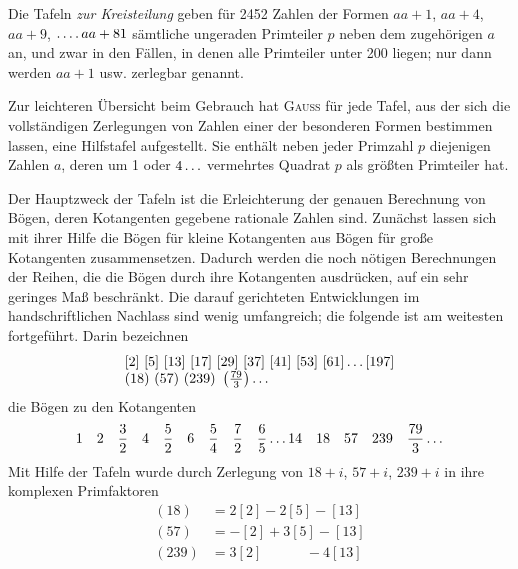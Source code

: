 \par Die Tafeln \textit{zur Kreisteilung} geben für 2452 Zahlen der Formen $aa+1$, $aa+4$, $aa+9$, $\mathinner{.\,.\,.\,.} aa+81$ sämtliche ungeraden Primteiler $p$ neben dem zugehörigen $a$ an, und zwar in den Fällen, in denen alle Primteiler unter 200 liegen; nur dann werden $aa+1$ usw. zerlegbar genannt.
\par Zur leichteren Übersicht beim Gebrauch hat \textsc{Gauss} für jede Tafel, aus der sich die vollständigen Zerlegungen von Zahlen einer der besonderen Formen bestimmen lassen, eine Hilfstafel aufgestellt. Sie enthält neben jeder Primzahl $p$ diejenigen Zahlen $a$, deren um 1 oder $4\mathinner{.\,.\,.}$ vermehrtes Quadrat $p$ als größten Primteiler hat.
\par Der Hauptzweck der Tafeln ist die Erleichterung der genauen Berechnung von Bögen, deren Kotangenten gegebene rationale Zahlen sind. Zunächst lassen sich mit ihrer Hilfe die Bögen für kleine Kotangenten aus Bögen für große Kotangenten zusammensetzen. Dadurch werden die noch nötigen Berechnungen der Reihen, die die Bögen durch ihre Kotangenten ausdrücken, auf ein sehr geringes Maß beschränkt. Die darauf gerichteten Entwicklungen im handschriftlichen Nachlass sind wenig umfangreich; die folgende ist am weitesten fortgeführt. Darin bezeichnen
\[
\begin{array}{l}
[2]\ [5]\ [13]\ [17]\ [29]\ [37]\ [41]\ [53]\ [61]\mathinner{.\,.\,.}[197]\\
(18)\ (57)\ (239)\ \left(\frac{79}{3}\right)\mathinner{.\,.\,.}
\end{array}
\]
die Bögen zu den Kotangenten
\[
1\quad2\quad\frac{3}{2}\quad4\quad\frac{5}{2}\quad6\quad\frac{5}{4}\quad\frac{7}{2}\quad\frac{6}{5}\mathinner{.\,.\,.}14\quad18\quad57\quad239\quad\frac{79}{3}\mathinner{.\,.\,.}
\]
Mit Hilfe der Tafeln wurde durch Zerlegung von $18+i$, $57+i$, $239+i$ in ihre komplexen Primfaktoren
\[
\begin{aligned}
(18)&=2[2]-2[5]-[13]\\
(57)&=-[2]+3[5]-[13]\\
(239)&=3[2]\phantom{-2[5]}-4[13]
\end{aligned}
\]
\endgroup
